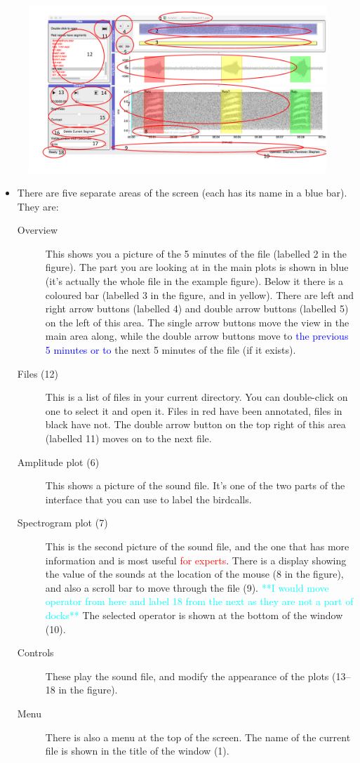 \documentclass{article}
\begin{document}
\begin{figure}[h!]
\centering
\includegraphics[width=.8\textwidth]{Figs/avianzinterface.pdf}
\end{figure}

\begin{itemize}
\item There are five separate areas of the screen (each has its name in a blue bar). They are:
	\begin{description}
	\item[Overview] This shows you a picture of the 5 minutes of the file (labelled 2 in the figure). The part you are looking at in the main plots is shown in blue (it's actually the whole file in the example figure). Below it there is a coloured bar (labelled 3 in the figure, and in yellow). There are left and right arrow buttons (labelled 4) and double arrow buttons (labelled 5) on the left of this area. The single arrow buttons move the view in the main area along, while the double arrow buttons move to \textcolor{blue}{the previous 5 minutes or to} the next 5 minutes of the file (if it exists). 
	\item [Files (12)] This is a list of files in your current directory. You can double-click on one to select it and open it. Files in red have been annotated, files in black have not. The double arrow button on the top right of this area (labelled 11) moves on to the next file.
	\item[Amplitude plot (6)] This shows a picture of the sound file. It's one of the two parts of the interface that you can use to label the birdcalls. 
	\item[Spectrogram plot (7)] This is the second picture of the sound file, and the one that has more information and is most useful \textcolor{red}{for experts}. There is a display showing the value of the sounds at the location of the mouse (8 in the figure), and also a scroll bar to move through the file (9). \textcolor{cyan}{**I would move operator from here and label 18 from the next as they are not a part of docks**} The selected operator is shown at the bottom of the window (10).
	\item[Controls] These play the sound file, and modify the appearance of the plots (13--18 in the figure).
	\item[Menu] There is also a menu at the top of the screen. The name of the current file is shown in the title of the window (1).
	\end{description}


\end{itemize}
\end{document}
